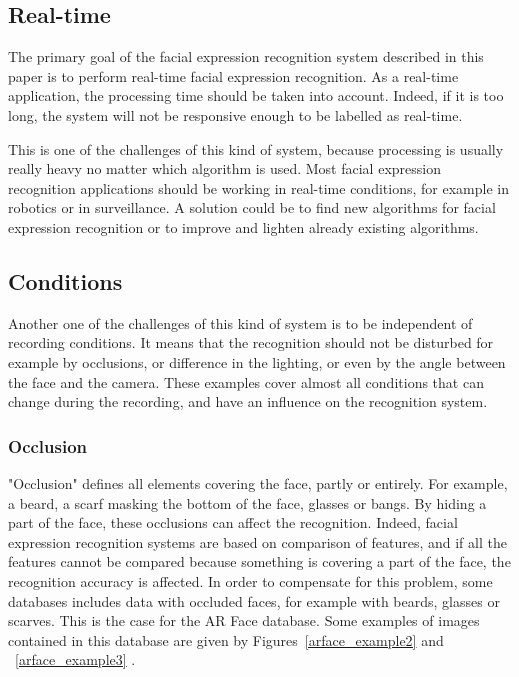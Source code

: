 \subsection{Real-time}

\vspace{\baselineskip}
\noindent The primary goal of the facial expression recognition system described in this paper is to perform real-time facial expression recognition. As a real-time application, the processing time should be taken into account. Indeed, if it is too long, the system will not be responsive enough to be labelled as real-time.
\newline

\noindent This is one of the challenges of this kind of system, because processing is usually really heavy no matter which algorithm is used. Most facial expression recognition applications should be working in real-time conditions, for example in robotics or in surveillance. A solution could be to find new algorithms for facial expression recognition or to improve and lighten already existing algorithms.
\newline

\subsection{Conditions}

\vspace{\baselineskip}
\noindent Another one of the challenges of this kind of system is to be independent of recording conditions. It means that the recognition should not be disturbed for example by occlusions, or difference in the lighting, or even by the angle between the face and the camera. These examples cover almost all conditions that can change during the recording, and have an influence on the recognition system. 
\newline

\subsubsection{Occlusion}

\vspace{\baselineskip}
\noindent "Occlusion" defines all elements covering the face, partly or entirely. For example, a beard, a scarf masking the bottom of the face, glasses or bangs. By hiding a part of the face, these occlusions can affect the recognition. Indeed, facial expression recognition systems are based on comparison of features, and if all the features cannot be compared because something is covering a part of the face, the recognition accuracy is affected. In order to compensate for this problem, some databases includes data with occluded faces, for example with beards, glasses or scarves. This is the case for the AR Face database. Some examples of images contained in this database are given by Figures~\ref{arface_example2} and ~\ref{arface_example3} \cite{ARFACE}.
\newline

